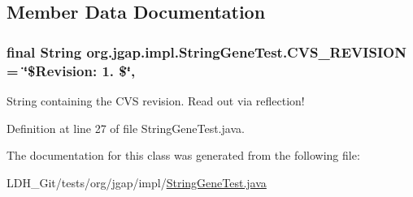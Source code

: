 \subsection{Member Data Documentation}
\hypertarget{classorg_1_1jgap_1_1impl_1_1_string_gene_test_af5e85cefc10545caddd39a1588178d1e}{
\subsubsection[{C\-V\-S\-\_\-\-R\-E\-V\-I\-S\-I\-O\-N}]{\setlength{\rightskip}{0pt plus 5cm}final String org.\-jgap.\-impl.\-String\-Gene\-Test.\-C\-V\-S\-\_\-\-R\-E\-V\-I\-S\-I\-O\-N = \char`\"{}\$Revision\-: 1. \$\char`\"{}\hspace{0.3cm}{\ttfamily [static]}, {\ttfamily [private]}}}\label{classorg_1_1jgap_1_1impl_1_1_string_gene_test_af5e85cefc10545caddd39a1588178d1e}
String containing the C\-V\-S revision. Read out via reflection! 

Definition at line 27 of file String\-Gene\-Test.\-java.



The documentation for this class was generated from the following file\-:\begin{DoxyCompactItemize}
\item 
L\-D\-H\-\_\-\-Git/tests/org/jgap/impl/\hyperlink{_string_gene_test_8java}{String\-Gene\-Test.\-java}\end{DoxyCompactItemize}

